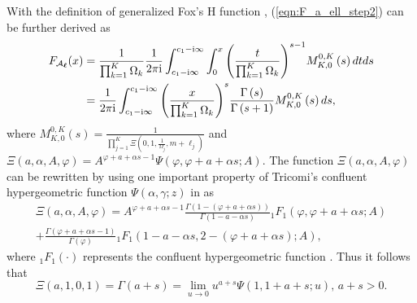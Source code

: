 \documentclass[12pt,onecolumn,draftcls]{IEEEtran}
\newcommand{\bs}{\boldsymbol}
\begin{document}
With the definition of generalized Fox's H function \cite{yilmaz2010outage,chelli2013performance}, (\ref{eqn:F_a_ell_step2}) can be further derived as
\begin{align}\label{eqn:F_a_ell_step3}
{F_{{{\cal A}_{\bs \ell} }}}(x) &= \frac{1}{{\prod\nolimits_{k = 1}^K {{\Omega _k}} }}\frac{1}{{2\pi {\rm i}}}\int_{c_1-{\rm i}\infty}^{c_1-{\rm i}\infty} {\int_0^x {{{\left( {\frac{t}{{\prod\nolimits_{k = 1}^K {{\Omega _k}} }}} \right)}^{s - 1}}M_{K,0}^{0,K}\left( s \right)dt} ds} \notag\\
 &= \frac{1}{{2\pi {\rm i}}}\int_{c_1-{\rm i}\infty}^{c_1-{\rm i}\infty} {{{\left( {\frac{x}{{\prod\nolimits_{k = 1}^K {{\Omega _k}} }}} \right)}^s}\frac{{\Gamma \left( s \right)}}{{\Gamma \left( {s + 1} \right)}}M_{K,0}^{0,K}\left( s \right)ds},
\end{align}
where $M_{K,0}^{0,K}\left( s \right) = \frac{1}{{\prod\nolimits_{j = 1}^K {\Xi \left( {0,1,\frac{1}{{{\Omega _j}}},m + {\ell _j}} \right)} }}$ %
and $\Xi \left( {a,\alpha ,A,\varphi } \right) = {A^{\varphi  + a + \alpha s - 1}}\Psi \left( {\varphi ,\varphi  + a + \alpha s;A} \right)$.
The function $\Xi \left( {a,\alpha ,A,\varphi } \right)$ can be rewritten by using one important property of Tricomi's confluent hypergeometric function $\Psi \left( {\alpha ,\gamma ;z} \right)$ in \cite[Eq.9.210.2]{gradshteyn1965table} as
\begin{multline}\label{eqn:Xi_rew}
\Xi \left( {a,\alpha ,A,\varphi } \right) = {A^{\varphi  + a + \alpha s - 1}}\frac{{\Gamma \left( {1 - \left( {\varphi  + a + \alpha s} \right)} \right)}}{{\Gamma \left( {1 - a - \alpha s} \right)}}{}_1{F_1}\left( {\varphi ,\varphi  + a + \alpha s;A} \right)\\
 + \frac{{\Gamma \left( {\varphi  + a + \alpha s - 1} \right)}}{{\Gamma \left( \varphi  \right)}}{}_1{F_1}\left( {1 - a - \alpha s,2 - \left( {\varphi  + a + \alpha s} \right);A} \right),
\end{multline}
where ${}_{1}F_{1}(\cdot)$ represents the confluent hypergeometric function \cite[Eq.9.210.1]{gradshteyn1965table}. Thus it follows that
\begin{equation}\label{eqn:gamma__plus_s}
\Xi \left( {a,1,0,1} \right)= \Gamma \left( {a + s} \right) = \mathop {\lim }\limits_{u \to 0} {u^{a + s}}\Psi \left( {1,1 + a + s;u} \right), \, a+s > 0.
\end{equation}
\end{document}
